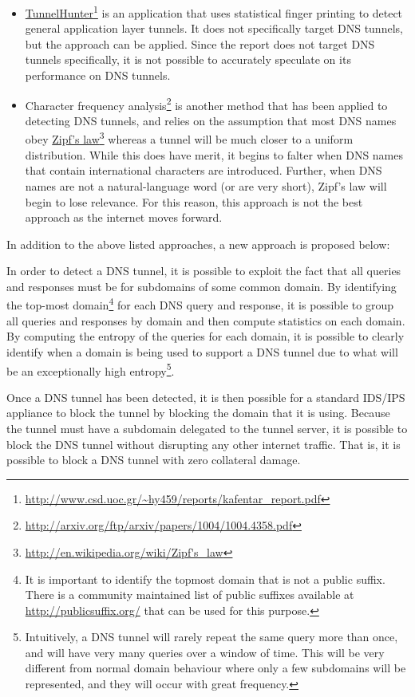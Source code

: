 \documentclass{article}
\newcommand{\hreff}[2]{\href{#1}{#2}\footnote{\url{#1}}}
\theoremstyle{remark}
\theoremstyle{definition}
\theoremstyle{definition}
\theoremstyle{definition}
\begin{document}
\begin{itemize}
\item \hreff{http://www.csd.uoc.gr/~hy459/reports/kafentar_report.pdf}{TunnelHunter} is an application that uses statistical finger printing to detect general application layer tunnels. It does not specifically target DNS tunnels, but the approach can be applied. Since the report does not target DNS tunnels specifically, it is not possible to accurately speculate on its performance on DNS tunnels.
\item Character frequency analysis\footnote{\url{http://arxiv.org/ftp/arxiv/papers/1004/1004.4358.pdf}} is another method that has been applied to detecting DNS tunnels, and relies on the assumption that most DNS names obey \hreff{http://en.wikipedia.org/wiki/Zipf's_law}{Zipf's law} whereas a tunnel will be much closer to a uniform distribution. While this does have merit, it begins to falter when DNS names that contain international characters are introduced. Further, when DNS names are not a natural-language word (or are very short), Zipf's law will begin to lose relevance. For this reason, this approach is not the best approach as the internet moves forward.
\end{itemize}

In addition to the above listed approaches, a new approach is proposed below:

In order to detect a DNS tunnel, it is possible to exploit the fact that all queries and responses must be for subdomains of some common domain. By identifying the top-most domain\footnote{It is important to identify the topmost domain that is not a public suffix. There is a community maintained list of public suffixes available at \url{http://publicsuffix.org/} that can be used for this purpose.} for each DNS query and response, it is possible to group all queries and responses by domain and then compute statistics on each domain. By computing the entropy of the queries for each domain, it is possible to clearly identify when a domain is being used to support a DNS tunnel due to what will be an exceptionally high entropy\footnote{Intuitively, a DNS tunnel will rarely repeat the same query more than once, and will have very many queries over a window of time. This will be very different from normal domain behaviour where only a few subdomains will be represented, and they will occur with great frequency.}.

Once a DNS tunnel has been detected, it is then possible for a standard IDS/IPS appliance to block the tunnel by blocking the domain that it is using. Because the tunnel must have a subdomain delegated to the tunnel server, it is possible to block the DNS tunnel without disrupting any other internet traffic. That is, it is possible to block a DNS tunnel with zero collateral damage.
\end{document}
